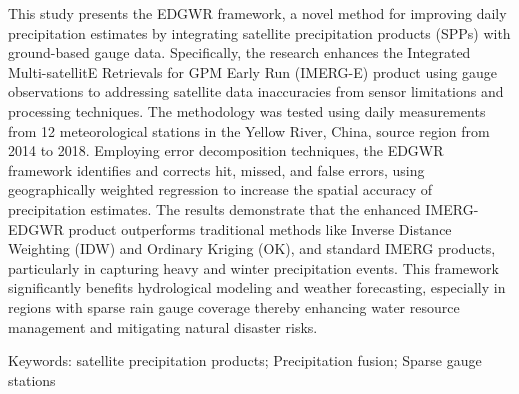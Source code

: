 \noindent

This study presents the EDGWR framework, a novel method for improving daily precipitation estimates by integrating satellite precipitation products (SPPs) with ground-based gauge data. Specifically, the research enhances the Integrated Multi-satellitE Retrievals for GPM Early Run (IMERG-E) product using gauge observations to addressing satellite data inaccuracies from sensor limitations and processing techniques. The methodology was tested using daily measurements from 12 meteorological stations in the Yellow River, China, source region from 2014 to 2018. Employing error decomposition techniques, the EDGWR framework identifies and corrects hit, missed, and false errors, using geographically weighted regression to increase the spatial accuracy of precipitation estimates. The results demonstrate that the enhanced IMERG-EDGWR product outperforms traditional methods like Inverse Distance Weighting (IDW) and Ordinary Kriging (OK), and standard IMERG products, particularly in capturing heavy and winter precipitation events. This framework significantly benefits hydrological modeling and weather forecasting, especially in regions with sparse rain gauge coverage thereby enhancing water resource management and mitigating natural disaster risks.

Keywords: satellite precipitation products; Precipitation fusion; Sparse gauge stations
\newpage{}
{}
\begin{flushleft}







\end{flushleft}

\noindent

